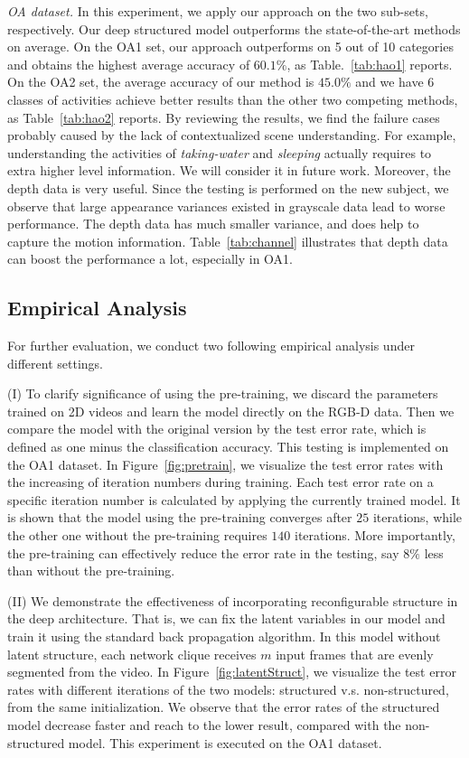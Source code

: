 \documentclass{sig-alternate}
\begin{document}
\emph{OA dataset.} In this experiment, we apply our approach on the two sub-sets, respectively. Our deep structured model outperforms the state-of-the-art methods on average. On the OA1 set, our approach outperforms on 5 out of 10 categories and obtains the highest average accuracy of $60.1\%$, as Table.~\ref{tab:hao1} reports. On the OA2 set, the average accuracy of our method is $45.0\%$ and we have 6 classes of activities achieve better results than the other two competing methods, as Table~\ref{tab:hao2} reports. By reviewing the results, we find the failure cases probably caused by the lack of contextualized scene understanding. For example, understanding the activities of {\em taking-water} and {\em sleeping} actually requires to extra higher level information. We will consider it in future work. Moreover, the depth data is very useful. Since the testing is performed on the new subject, we observe that large appearance variances existed in grayscale data lead to worse performance. The depth data has much smaller variance, and does help to capture the motion information. Table~\ref{tab:channel} illustrates that depth data can boost the performance a lot, especially in OA1. 


\vspace{5mm}
\subsection{Empirical Analysis}

For further evaluation, we conduct two following empirical analysis under different settings.

(I) To clarify significance of using the pre-training, we discard the parameters trained on 2D videos and learn the model directly on the RGB-D data. Then we compare the model with the original version by the test error rate, which is defined as one minus the classification accuracy. This testing is implemented on the OA1 dataset. In Figure~\ref{fig:pretrain}, we visualize the test error rates with the increasing of iteration numbers during training.  Each test error rate on a specific iteration number is calculated by applying the currently trained model. It is shown that the model using the pre-training converges after $25$ iterations, while the other one without the pre-training requires $140$ iterations. More importantly, the pre-training can effectively reduce the error rate in the testing, say $8\%$ less than without the pre-training.

(II) We demonstrate the effectiveness of incorporating reconfigurable structure in the deep architecture. That is, we can fix the latent variables in our model and train it using the standard back propagation algorithm. In this model without latent structure, each network clique receives $m$ input frames that are evenly segmented from the video. In Figure~\ref{fig:latentStruct}, we visualize the test error rates with different iterations of the two models: structured v.s. non-structured, from the same initialization. We observe that the error rates of the structured model decrease faster and reach to the lower result, compared with the non-structured model. This experiment is executed on the OA1 dataset.
\end{document}
